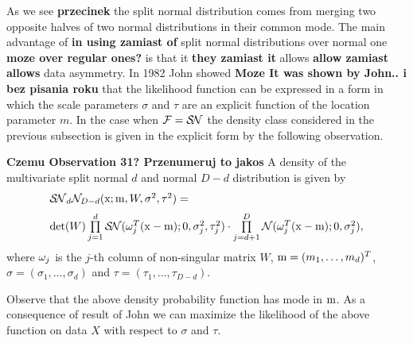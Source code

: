 As we see \textbf{przecinek} the split normal distribution comes from merging two opposite halves of two normal distributions in their common mode. The main advantage of \textbf{in using zamiast of} split normal distributions over normal one \textbf{moze over regular ones?} is that it \textbf{they zamiast it} allows \textbf{allow zamiast allows} data asymmetry. In 1982 John \cite{john1982three} showed \textbf{Moze It was shown by John.. i bez pisania roku} that the likelihood function can be expressed in a  form in which the scale parameters $\sigma$ and $\tau$ are an explicit function of the location parameter $m$.
In the case when $\mathcal{F}=\mbox{$\mathcal{S\!N}$}$
the density class considered in the previous subsection is given in the
explicit form by the following observation.

\begin{observation}\label{def:GSN}
  \textbf{Czemu Observation 31? Przenumeruj to jakos} A density of the multivariate split normal $d$ and normal $D-d$ distribution is given by
$$
\begin{array}{l}
\SN_{d}\nor_{D-d}(\x; \m,W, \sigma^2,\tau^2)=\\[6pt]
\det(W) \prod \limits_{j=1}^{d} \SN(\w_j^T(\x-\m);0,\sigma_j^2,\tau_j^2)%
\cdot \prod \limits_{j=d+1}^{D} \nor(\w_j^T(\x-\m);0,\sigma_j^2),
\end{array}
$$
where $\omega_{j}$ is the $j$-th column of non-singular matrix $W$, $\mathrm{m} = (m_1, \ldots, m_d)^T$, $\sigma = (\sigma_{1},\ldots,\sigma_{d})$ and $\tau=(\tau_{1},\ldots,\tau_{D-d})$.
\end{observation}

Observe that the above density probability function has mode in $\mathrm{m}$.
As a consequence of result of John \cite{john1982three} we can maximize the likelihood of the above function on data $X$ with respect to $\sigma$ and $\tau$.

